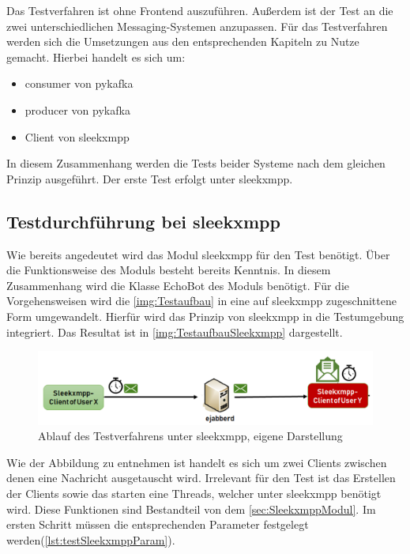 \documentclass[a4paper,titlepage,halfparskip,12pt]{scrreprt}
\begin{document}
\begin{onehalfspacing}
Das Testverfahren ist ohne Frontend auszuführen. Außerdem ist der Test an die zwei unterschiedlichen Messaging-Systemen anzupassen. Für das Testverfahren werden sich die Umsetzungen aus den entsprechenden Kapiteln zu Nutze gemacht. Hierbei handelt es sich um:
\begin{itemize}
	\item consumer von pykafka
	\item producer von pykafka
	\item Client von sleekxmpp
\end{itemize}
In diesem Zusammenhang werden die Tests beider Systeme nach dem gleichen Prinzip ausgeführt. Der erste Test erfolgt unter sleekxmpp.

\subsection*{Testdurchführung bei sleekxmpp}
\label{subssec:Testsleekxmpp}
Wie bereits angedeutet wird das Modul sleekxmpp für den Test benötigt. Über die Funktionsweise des Moduls besteht bereits Kenntnis. In diesem Zusammenhang wird die Klasse EchoBot des Moduls benötigt. Für die Vorgehensweisen wird die \autoref{img:Testaufbau} in eine auf sleekxmpp zugeschnittene Form umgewandelt.
Hierfür wird das Prinzip von sleekxmpp in die Testumgebung integriert. Das Resultat ist in \autoref{img:TestaufbauSleekxmpp} dargestellt.
\begin{figure}[h]
	\centering
	\includegraphics[scale=0.7]{images/TestaufbauSleekxmpp}
	\caption{Ablauf des Testverfahrens unter sleekxmpp, eigene Darstellung}
	\label{img:TestaufbauSleekxmpp}
\end{figure}
Wie der Abbildung zu entnehmen ist handelt es sich um zwei Clients zwischen denen eine Nachricht ausgetauscht wird. Irrelevant für den Test ist das Erstellen der Clients sowie das starten eine Threads, welcher unter sleekxmpp benötigt wird. Diese Funktionen sind Bestandteil von dem \autoref{sec:SleekxmppModul}. Im ersten Schritt müssen die entsprechenden Parameter festgelegt werden(\autoref{lst:testSleekxmppParam}).
\begin{lstlisting}[language=python, caption={Parameter für den Test}, label={lst:testSleekxmppParam}]

\end{lstlisting}
\end{onehalfspacing}
\end{document}
